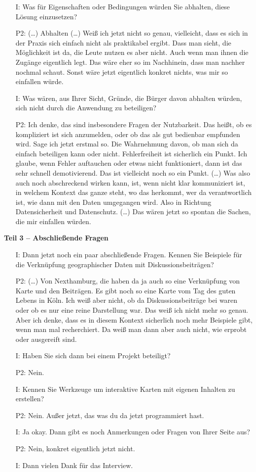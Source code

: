 \begin{itemize}
    \item[I:] Was f{\"u}r Eigenschaften oder Bedingungen w{\"u}rden Sie abhalten, diese L{\"o}sung einzusetzen?
    \item[P2:] (\dots) Abhalten (\dots) Wei{\ss} ich jetzt nicht so genau, vielleicht, dass es sich in der Praxis sich einfach nicht als praktikabel ergibt. Dass man sieht, die M{\"o}glichkeit ist da, die Leute nutzen es aber nicht. Auch wenn man ihnen die Zug{\"a}nge eigentlich legt. Das w{\"a}re eher so im Nachhinein, dass man nachher nochmal schaut. Sonst w{\"a}re jetzt eigentlich konkret nichts, was mir so einfallen w{\"u}rde.
    \item[I:] Was w{\"a}ren, aus Ihrer Sicht, Gr{\"u}nde, die B{\"u}rger davon abhalten w{\"u}rden, sich nicht durch die Anwendung zu beteiligen?
    \item[P2:] Ich denke, das sind insbesondere Fragen der Nutzbarkeit. Das hei{\ss}t, ob es kompliziert ist sich anzumelden, oder ob das als gut bedienbar empfunden wird. Sage ich jetzt erstmal so. Die Wahrnehmung davon, ob man sich da einfach beteiligen kann oder nicht. Fehlerfreiheit ist sicherlich ein Punkt. Ich glaube, wenn Fehler auftauchen oder etwas nicht funktioniert, dann ist das sehr schnell demotivierend. Das ist vielleicht noch so ein Punkt. (\dots) Was also auch noch abschreckend wirken kann, ist, wenn nicht klar kommuniziert ist, in welchem Kontext das ganze steht, wo das herkommt, wer da verantwortlich ist, wie dann mit den Daten umgegangen wird. Also in Richtung Datensicherheit und Datenschutz. (\dots) Das w{\"a}ren jetzt so spontan die Sachen, die mir einfallen w{\"u}rden.
\end{itemize}

\textbf{Teil 3 -- Abschlie{\ss}ende Fragen}
\begin{itemize}
    \item[I:] Dann jetzt noch ein paar abschlie{\ss}ende Fragen. Kennen Sie Beispiele f{\"u}r die Verkn{\"u}pfung geographischer Daten mit Diskussionsbeitr{\"a}gen?
    \item[P2:] (\dots) Von Nexthamburg, die haben da ja auch so eine Verkn{\"u}pfung von Karte und den Beitr{\"a}gen. Es gibt noch so eine Karte vom Tag des guten Lebens in K{\"o}ln. Ich wei{\ss} aber nicht, ob da Diskussionsbeitr{\"a}ge bei waren oder ob es nur eine reine Darstellung war. Das wei{\ss} ich nicht mehr so genau. Aber ich denke, dass es in diesem Kontext sicherlich noch mehr Beispiele gibt, wenn man mal recherchiert. Da wei{\ss} man dann aber auch nicht, wie erprobt oder ausgereift sind.
    \item[I:] Haben Sie sich dann bei einem Projekt beteiligt?
    \item[P2:] Nein.
    \item[I:] Kennen Sie Werkzeuge um interaktive Karten mit eigenen Inhalten zu erstellen?
    \item[P2:] Nein. Au{\ss}er jetzt, das was du da jetzt programmiert hast. 
    \item[I:] Ja okay. Dann gibt es noch Anmerkungen oder Fragen von Ihrer Seite aus?
    \item[P2:] Nein, konkret eigentlich jetzt nicht.
    \item[I:] Dann vielen Dank f{\"u}r das Interview.
\end{itemize}